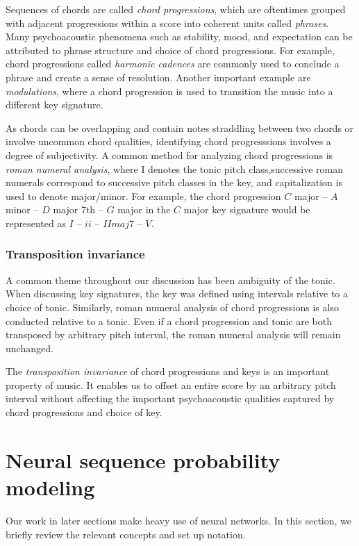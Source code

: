 Sequences of chords are called \emph{chord progressions}, which are oftentimes
grouped with adjacent progressions within a score into coherent units called
\emph{phrases}. Many psychoacoustic phenomena such as stability, mood, and
expectation can be attributed to phrase structure and choice of chord
progressions. For example, chord progressions called \emph{harmonic cadences}
are commonly used to conclude a phrase and create a sense of
resolution\citep{randel1999harvard}. Another important example are
\emph{modulations}, where a chord progression is used to transition the music
into a different key signature.

As chords can be overlapping and contain notes straddling between two chords or
involve uncommon chord qualities, identifying chord progresssions involves a
degree of subjectivity. A common method for analyzing chord progressions is
\emph{roman numeral analysis}, where I denotes the tonic pitch class,successive
roman numerals correspond to successive pitch classes in the key, and
capitalization is used to denote major/minor. For example, the chord
progression $C$ major -- $A$ minor -- $D$ major 7th -- $G$ major in the $C$
major key signature would be represented as $I$ -- $ii$ -- $IImaj7$ -- $V$.

\subsubsection{Transposition invariance}

A common theme throughout our discussion has been ambiguity of the tonic. When
discussing key signatures, the key was defined using intervals relative to a
choice of tonic. Similarly, roman numeral analysis of chord progressions is
also conducted relative to a tonic. Even if a chord progression and tonic are
both transposed by arbitrary pitch interval, the roman numeral analysis will
remain unchanged.

The \emph{transposition invariance} of chord progressions and keys is an
important property of music. It enables us to offset an entire score by an
arbitrary pitch interval without affecting the important psychoacoustic
qualities captured by chord progressions and choice of key.

\section{Neural sequence probability modeling}

Our work in later sections make heavy use of neural networks. In this section,
we briefly review the relevant concepts and set up notation.

